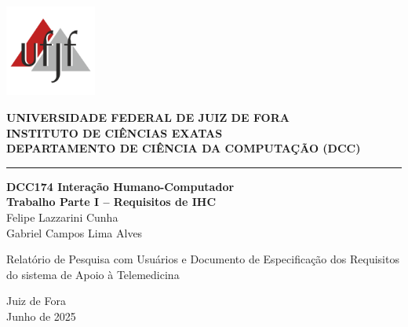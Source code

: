 \documentclass[12pt, a4paper, oneside]{abntex2}
\begin{document}
\begin{folhaderosto}
    \centering
    \begin{minipage}{0.2\textwidth}
        \includegraphics[width=3cm]{Imagens/ufjf-logo.png}
    \end{minipage}
    \hfill
    \begin{minipage}{0.7\textwidth}
        \raggedright
        \textbf{UNIVERSIDADE FEDERAL DE JUIZ DE FORA} \\
        \textbf{INSTITUTO DE CIÊNCIAS EXATAS} \\
        \textbf{DEPARTAMENTO DE CIÊNCIA DA COMPUTAÇÃO (DCC)}
    \end{minipage}
    \vspace*{3cm}
    \rule{\textwidth}{0pt}

    \textbf{\Large DCC174 Interação Humano-Computador} \\
    \vspace{0.5cm}
    \textbf{\Large Trabalho Parte I – Requisitos de IHC} \\
    \vspace{3cm}
    Felipe Lazzarini Cunha \\
    Gabriel Campos Lima Alves \\
    \vspace*{3cm}
    \hfill %
    \begin{minipage}{0.6\textwidth} %
        \raggedright %
        Relatório de Pesquisa com Usuários e Documento de Especificação dos Requisitos do sistema de Apoio à Telemedicina
    \end{minipage}
    \vfill
    \vspace*{1cm}
    \begin{center}
    Juiz de Fora\\
    Junho de 2025
    \end{center}
\end{folhaderosto}

\tableofcontents
\cleardoublepage
\end{document}
